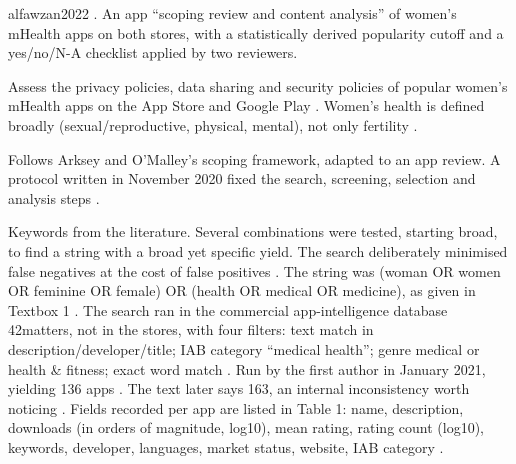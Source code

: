 \begin{papercard}{alfawzan2022}
   . An app ``scoping review and content analysis'' of women's mHealth apps on both stores, with a statistically derived popularity cutoff and a yes/no/N-A checklist applied by two reviewers.

 Assess the privacy policies, data sharing and security policies of popular women's mHealth apps on the App Store and Google Play . Women's health is defined broadly (sexual/reproductive, physical, mental), not only fertility .

 Follows Arksey and O'Malley's scoping framework, adapted to an app review. A protocol written in November 2020 fixed the search, screening, selection and analysis steps .

 Keywords from the literature. Several combinations were tested, starting broad, to find a string with a broad yet specific yield. The search deliberately minimised false negatives at the cost of false positives . The string was (woman OR women OR feminine OR female) OR (health OR medical OR medicine), as given in Textbox 1 . The search ran in the commercial app-intelligence database 42matters, not in the stores, with four filters: text match in description/developer/title; IAB category ``medical health''; genre medical or health \& fitness; exact word match . Run by the first author in January 2021, yielding 136 apps . The text later says 163, an internal inconsistency worth noticing . Fields recorded per app are listed in Table 1: name, description, downloads (in orders of magnitude, log10), mean rating, rating count (log10), keywords, developer, languages, market status, website, IAB category .


\end{papercard}
